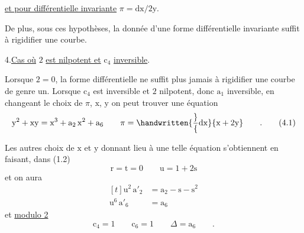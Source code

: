\uline{et pour différentielle invariante} $\pi=\mathrm{dx}/2\mathrm{y}$.

De plus, sous ces hypothèses, la donnée d'une forme différentielle invariante suffit à rigidifier une courbe.

4.\qquad \uline{Cas où} $2$ \uline{est nilpotent et} $\mathrm{c}_{4}$ \uline{inversible}.

Lorsque $2=0$, la forme différentielle ne suffit plus jamais à rigidifier une courbe de genre un. Lorsque $\mathrm{c}_{4}$ est inversible et $2$ nilpotent, donc $\mathrm{a}_{1}$ inversible, en changeant le choix de $\pi$, $\mathrm{x}$, $\mathrm{y}$ on peut trouver une équation
\[
\mathrm{y}^{2}+\mathrm{xy}=\mathrm{x}^{3}+\mathrm{a}_{2}\,\mathrm{x}^{2}+\mathrm{a}_{6}\qquad
\pi=\handwritten{\frac}{\mathrm{dx}}{\mathrm{x}+2\mathrm{y}}\qquad.
\tag*{(4.1)}
\]

Les autres choix de $\mathrm{x}$ et $\mathrm{y}$ donnant lieu à une telle équation s'obtiennent en faisant, dans (1.2)
\[
\mathrm{r}=\mathrm{t}=0\qquad\mathrm{u}=1+2\mathrm{s}
\tag*{(4.2)}
\]
et on aura
\[
\begin{aligned}[t]
\mathrm{u}^{2}\,\mathrm{a}'_{2}&=\mathrm{a}_{2}-\mathrm{s}-\mathrm{s}^{2}\\
\mathrm{u}^{6}\,\mathrm{a}'_{6}&=\mathrm{a}_{6}
\end{aligned}
\tag*{(4.3)}
\]
et \uline{modulo 2}
\[
\mathrm{c}_{4}=1\qquad\mathrm{c}_{6}=1\qquad\Delta=\mathrm{a}_{6}\qquad.
\tag*{(4.4)}
\]

